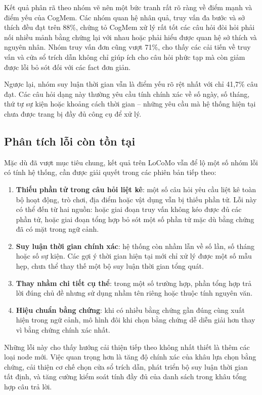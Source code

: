 \documentclass[../main.tex]{subfiles}
\begin{document}
Kết quả phân rã theo nhóm vẽ nên một bức tranh rất rõ ràng về điểm mạnh và điểm yếu của CogMem. Các nhóm quan hệ nhân quả, truy vấn đa bước và sở thích đều đạt trên 88\%, chứng tỏ CogMem xử lý rất tốt các câu hỏi đòi hỏi phải nối nhiều mảnh bằng chứng lại với nhau hoặc phải hiểu được quan hệ sở thích và nguyên nhân. Nhóm truy vấn đơn cũng vượt 71\%, cho thấy các cải tiến về truy vấn và cửa sổ trích dẫn không chỉ giúp ích cho câu hỏi phức tạp mà còn giảm được lỗi bỏ sót đối với các fact đơn giản.

Ngược lại, nhóm suy luận thời gian vẫn là điểm yếu rõ rệt nhất với chỉ 41,7\% câu đạt. Các câu hỏi dạng này thường yêu cầu tính chính xác về số ngày, số tháng, thứ tự sự kiện hoặc khoảng cách thời gian -- những yêu cầu mà hệ thống hiện tại chưa được trang bị đầy đủ công cụ để xử lý.

\subsection{Phân tích lỗi còn tồn tại}

Mặc dù đã vượt mục tiêu chung, kết quả trên LoCoMo vẫn để lộ một số nhóm lỗi có tính hệ thống, cần được giải quyết trong các phiên bản tiếp theo:

\begin{enumerate}
    \item \textbf{Thiếu phần tử trong câu hỏi liệt kê}: một số câu hỏi yêu cầu liệt kê toàn bộ hoạt động, trò chơi, địa điểm hoặc vật dụng vẫn bị thiếu phần tử. Lỗi này có thể đến từ hai nguồn: hoặc giai đoạn truy vấn không kéo được đủ các phần tử, hoặc giai đoạn tổng hợp bỏ sót một số phần tử mặc dù bằng chứng đã có mặt trong ngữ cảnh.
    \item \textbf{Suy luận thời gian chính xác}: hệ thống còn nhầm lẫn về số lần, số tháng hoặc số sự kiện. Các gợi ý thời gian hiện tại mới chỉ xử lý được một số mẫu hẹp, chưa thể thay thế một bộ suy luận thời gian tổng quát.
    \item \textbf{Thay nhầm chi tiết cụ thể}: trong một số trường hợp, phần tổng hợp trả lời đúng chủ đề nhưng sử dụng nhầm tên riêng hoặc thuộc tính nguyên văn.
    \item \textbf{Hiệu chuẩn bằng chứng}: khi có nhiều bằng chứng gần đúng cùng xuất hiện trong ngữ cảnh, mô hình đôi khi chọn bằng chứng dễ diễn giải hơn thay vì bằng chứng chính xác nhất.
\end{enumerate}

Những lỗi này cho thấy hướng cải thiện tiếp theo không nhất thiết là thêm các loại node mới. Việc quan trọng hơn là tăng độ chính xác của khâu lựa chọn bằng chứng, cải thiện cơ chế chọn cửa sổ trích dẫn, phát triển bộ suy luận thời gian tất định, và tăng cường kiểm soát tính đầy đủ của danh sách trong khâu tổng hợp câu trả lời.
\end{document}
